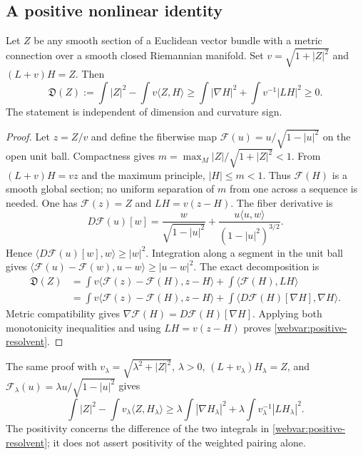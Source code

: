 \subsection{A positive nonlinear identity}

\begin{proposition}\label{webvar:resolvent-positive}
Let $Z$ be any smooth section of a Euclidean vector bundle with a
metric connection over a smooth closed Riemannian manifold.
Set $v=\sqrt{1+|Z|^2}$ and $(L+v)H=Z$.
Then
\begin{equation}\label{webvar:positive-resolvent}
 \mathfrak D(Z):=\int|Z|^2-\int v\langle Z,H\rangle
 \ge\int|\nabla H|^2+\int v^{-1}|LH|^2\ge0.
\end{equation}
The statement is independent of dimension and curvature sign.
\end{proposition}
\begin{proof}
Let $z=Z/v$ and define the fiberwise map
$\mathcal F(u)=u/\sqrt{1-|u|^2}$ on the open unit ball.
Compactness gives
$m=\max_M|Z|/\sqrt{1+|Z|^2}<1$.
From $(L+v)H=vz$ and the maximum principle, $|H|\le m<1$.
Thus $\mathcal F(H)$ is a smooth global section; no uniform
separation of $m$ from one across a sequence is needed.
One has $\mathcal F(z)=Z$ and $LH=v(z-H)$.
The fiber derivative is
\[
 D\mathcal F(u)[w]
 =\frac{w}{\sqrt{1-|u|^2}}
   +\frac{u\langle u,w\rangle}{(1-|u|^2)^{3/2}}.
\]
Hence $\langle D\mathcal F(u)[w],w\rangle\ge|w|^2$.
Integration along a segment in the unit ball gives
$\langle\mathcal F(u)-\mathcal F(w),u-w\rangle\ge|u-w|^2$.
The exact decomposition is
\begin{equation}\label{webvar:positive-resolvent-decomposition}
 \begin{split}
 \mathfrak D(Z)
 &=\int v\langle\mathcal F(z)-\mathcal F(H),z-H\rangle
          +\int\langle\mathcal F(H),LH\rangle\\
 &=\int v\langle\mathcal F(z)-\mathcal F(H),z-H\rangle
          +\int\langle D\mathcal F(H)[\nabla H],\nabla H\rangle.
 \end{split}
\end{equation}
Metric compatibility gives
$\nabla\mathcal F(H)=D\mathcal F(H)[\nabla H]$.
Applying both monotonicity inequalities and using $LH=v(z-H)$
proves \eqref{webvar:positive-resolvent}.
\end{proof}

The same proof with
$v_\lambda=\sqrt{\lambda^2+|Z|^2}$, $\lambda>0$,
$(L+v_\lambda)H_\lambda=Z$, and
$\mathcal F_\lambda(u)=\lambda u/\sqrt{1-|u|^2}$ gives
\begin{equation}\label{webvar:positive-resolvent-lambda}
 \int|Z|^2-\int v_\lambda\langle Z,H_\lambda\rangle
 \ge\lambda\int|\nabla H_\lambda|^2
       +\lambda\int v_\lambda^{-1}|LH_\lambda|^2.
\end{equation}
The positivity concerns the difference of the two integrals in
\eqref{webvar:positive-resolvent}; it does not assert positivity of
the weighted pairing alone.

